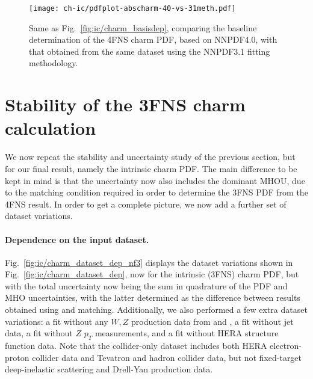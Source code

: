 \begin{figure}[t]
  \begin{center}
    \texttt{[image: ch-ic/pdfplot-abscharm-40-vs-31meth.pdf]}
    \caption{\small Same as Fig.~\ref{fig:ic/charm_basisdep}, comparing
      the baseline determination of the 4FNS charm PDF, based
      on NNPDF4.0, with that obtained
      from the same dataset using the NNPDF3.1 fitting methodology.
  \label{fig:ic/pdfplot-abscharm-40-vs-31meth} }
\end{center}
\end{figure}




\section{Stability of the 3FNS charm calculation}
\label{app:ic/charm_stability_3fns}

We now repeat the stability and uncertainty
study of the previous section, but for our final
result, namely the intrinsic charm PDF. The main difference to be kept
in mind is that the uncertainty now also includes the dominant MHOU,
due to the matching condition required in order to determine the 3FNS
PDF from the 4FNS result. In order to get a complete picture, we now
add a further set of dataset variations.

\paragraph{Dependence on the input dataset.}
%
Fig.~\ref{fig:ic/charm_dataset_dep_nf3} displays the dataset variations shown in
Fig.~\ref{fig:ic/charm_dataset_dep}, now for the intrinsic (3FNS) charm
PDF, but with the total uncertainty now being the sum in quadrature of
the PDF and MHO uncertainties, with the latter determined as the difference between
results obtained using \nnlo and \nnnlo matching.
%
Additionally, we also performed a few extra  dataset
variations: a fit without any $W, Z$ production data from \atlas and \cms,
a fit without jet data, a fit without $Z$ $p_T$ measurements, and a fit without
HERA structure function data.
%
Note that the collider-only dataset includes both HERA electron-proton
collider data and Tevatron and \lhc hadron collider data, but not
fixed-target deep-inelastic scattering and Drell-Yan production data.


